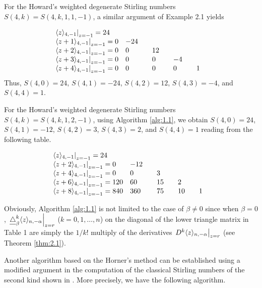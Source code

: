  \medbreak

 For the Howard's weighted degenerate Stirling numbers $S(4,k)=S(4,k,1,1,-1)$, a similar argument of Example 2.1 yields

\[
\begin{array}{lllll}
\left. \langle z\rangle_{4,-1}\right|_{z=-1}=24 & \quad &\quad  & \quad & \quad  \\
\left. \langle z+1\rangle_{4,-1}\right|_{z=-1}=0 &-24 \quad & & & \\
\left. \langle z+2\rangle_{4,-1}\right|_{z=-1}=0 & 0 \quad & 12 \quad & & \\
\left. \langle z+3\rangle_{4,-1}\right|_{z=-1}=0 & 0 \quad & 0\quad  & -4\quad  &\\
\left. \langle z+4\rangle_{4,-1}\right|_{z=-1}=0 & 0 \quad & 0 \quad & 0 \quad &1\quad
\end{array}
\]
Thus, $S(4,0)=24$, $S(4,1)=-24$, $S(4,2)=12$, $S(4,3)=-4$, and $S(4,4)=1$.

\medbreak

 For the Howard's weighted degenerate Stirling numbers $S(4,k)=S(4,k,1,2,-1)$, using Algorithm \ref{alg:1.1}, we obtain $S(4,0)=24$, $S(4,1)=-12$, $S(4,2)=3$, $S(4,3)=2$, and $S(4,4)=1$ reading from the following table.

\[
\begin{array}{lllll}
\left. \langle z\rangle_{4,-1}\right|_{z=-1}=24 & \quad &\quad  & \quad & \quad  \\
\left. \langle z+2\rangle_{4,-1}\right|_{z=-1}=0 &-12 \quad & & & \\
\left. \langle z+4\rangle_{4,-1}\right|_{z=-1}=0 & 0 \quad & 3 \quad & & \\
\left. \langle z+6\rangle_{4,-1}\right|_{z=-1}=120 & 60 \quad & 15\quad  & 2\quad  &\\
\left. \langle z+8\rangle_{4,-1}\right|_{z=-1}=840 & 360 \quad & 75 \quad & 10 \quad &1\quad
\end{array}
\]
\medbreak

 Obviously, Algorithm \ref{alg:1.1} is not limited to the case of $\beta\not= 0$ since when $\beta =0$, $\left. \underline\triangle^k_{\beta}\langle z\rangle_{n,-\alpha}\right|_{z=r}$ ($k=0,1,\ldots, n$) on the diagonal of the lower triangle matrix in Table 1 are simply the $1/k!$ multiply of the derivatives $\left. D^k \langle z\rangle_{n,-\alpha}\right|_{z=r}$ (see Theorem \ref{thm:2.1}).

Another algorithm based on the Horner's method can be established using a modified argument in the computation of the classical Stirling numbers of the second kind shown in \cite{HS10}.  More precisely, we have the following algorithm.

